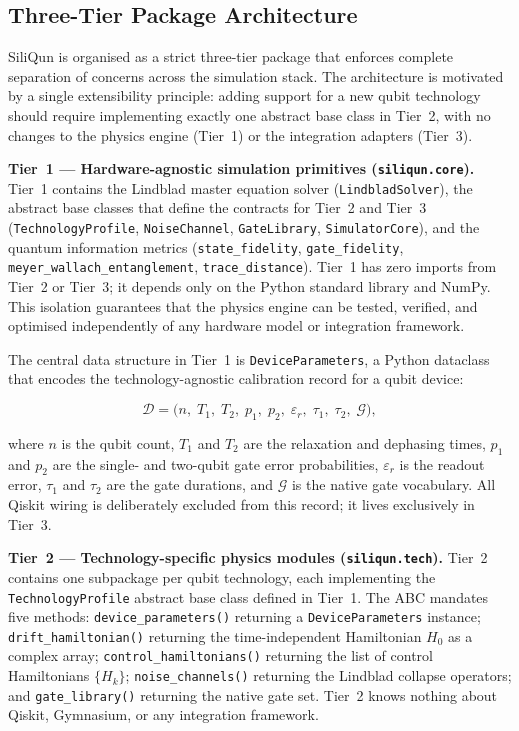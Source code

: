 \subsection{Three-Tier Package Architecture}
\label{subsec:three_tier}

SiliQun is organised as a strict three-tier package that enforces complete separation of concerns across the simulation stack.
The architecture is motivated by a single extensibility principle: adding support for a new qubit technology should require implementing exactly one abstract base class in Tier~2, with no changes to the physics engine (Tier~1) or the integration adapters (Tier~3).

\textbf{Tier~1 — Hardware-agnostic simulation primitives
(\texttt{siliqun.core}).}
Tier~1 contains the Lindblad master equation solver
(\texttt{LindbladSolver}), the abstract base classes that define the
contracts for Tier~2 and Tier~3 (\texttt{TechnologyProfile},
\texttt{NoiseChannel}, \texttt{GateLibrary}, \texttt{SimulatorCore}),
and the quantum information metrics (\texttt{state\_fidelity},
\texttt{gate\_fidelity}, \texttt{meyer\_wallach\_entanglement},
\texttt{trace\_distance}).
Tier~1 has zero imports from Tier~2 or Tier~3; it depends only on
the Python standard library and NumPy.
This isolation guarantees that the physics engine can be tested,
verified, and optimised independently of any hardware model or
integration framework.

The central data structure in Tier~1 is \texttt{DeviceParameters}, a
Python dataclass that encodes the technology-agnostic calibration record
for a qubit device:

\begin{equation}
  \mathcal{D} = \bigl(n,\; T_1,\; T_2,\; p_1,\; p_2,\;
  \varepsilon_r,\; \tau_1,\; \tau_2,\; \mathcal{G}\bigr),
  \label{eq:device_params}
\end{equation}

where $n$ is the qubit count, $T_1$ and $T_2$ are the relaxation and
dephasing times, $p_1$ and $p_2$ are the single- and two-qubit gate
error probabilities, $\varepsilon_r$ is the readout error, $\tau_1$ and
$\tau_2$ are the gate durations, and $\mathcal{G}$ is the native gate
vocabulary.
All Qiskit wiring is deliberately excluded from this record; it lives
exclusively in Tier~3.

\textbf{Tier~2 — Technology-specific physics modules
(\texttt{siliqun.tech}).}
Tier~2 contains one subpackage per qubit technology, each implementing
the \texttt{TechnologyProfile} abstract base class defined in Tier~1.
The ABC mandates five methods: \texttt{device\_parameters()} returning
a \texttt{DeviceParameters} instance; \texttt{drift\_hamiltonian()}
returning the time-independent Hamiltonian $H_0$ as a complex array;
\texttt{control\_hamiltonians()} returning the list of control
Hamiltonians $\{H_k\}$; \texttt{noise\_channels()} returning the
Lindblad collapse operators; and \texttt{gate\_library()} returning the
native gate set.
Tier~2 knows nothing about Qiskit, Gymnasium, or any integration
framework.

